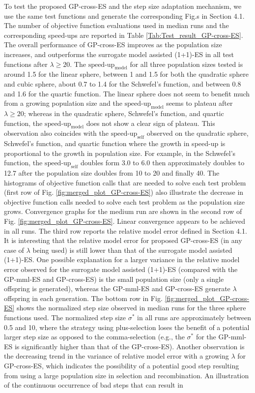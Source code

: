 To test the proposed GP-cross-ES and the step size adaptation mechanism, we use the same test functions and generate the corresponding Fig.s in Section 4.1. The number of objective function evaluations used in median runs and the corresponding speed-ups are reported in Table \ref{Tab:Test_result_GP-cross-ES}. The overall performance of GP-cross-ES improves as the population size increases, and outperforms the surrogate model assisted (1+1)-ES \cite{DBLP:conf/ppsn/KayhaniA18} in all test functions after $\lambda\geq 20$. The $\text{speed-up}_{\text{model}}$ for all three population sizes tested is around 1.5 for the linear sphere, between 1 and 1.5 for both the quadratic sphere and cubic sphere, about 0.7 to 1.4 for the Schwefel's function, and between 0.8 and 1.6 for the quartic function. The linear sphere does not seem to benefit much from a growing population size and the $\text{speed-up}_{\text{model}}$ seems to plateau after $\lambda \geq 20$; whereas in the quadratic sphere, Schwefel's function, and quartic function, the $\text{speed-up}_{\text{model}}$ does not show a clear sign of plateau. This observation also coincides with the $\text{speed-up}_{\text{self}}$ observed on the quadratic sphere, Schwefel's function, and quartic function where the growth in speed-up is proportional to the growth in population size. For example, in the Schwefel's function, the $\text{speed-up}_{\text{self}}$ doubles form 3.0 to 6.0 then approximately doubles to 12.7 after the population size doubles from 10 to 20 and finally 40. The histograms of objective function calls that are needed to solve each test problem (first row of Fig. \ref{fig:merged_plot_GP-cross-ES}) also illustrate the decrease in objective function calls needed to solve each test problem as the population size grows. Convergence graphs for the medium run are shown in the second row of Fig. \ref{fig:merged_plot_GP-cross-ES}. Linear convergence appears to be achieved in all runs. The third row reports the relative model error defined in Section 4.1. It is interesting that the relative model error for proposed GP-cross-ES (in any case of $\lambda$ being used) is still lower than that of the surrogate model assisted (1+1)-ES. One possible explanation for a larger variance in the relative model error observed for the surrogate model assisted (1+1)-ES (compared with the GP-mml-ES and GP-cross-ES) is the small population size (only a single offspring is generated), whereas the GP-mml-ES and GP-cross-ES generate $\lambda$ offspring in each generation. The bottom row in Fig. \ref{fig:merged_plot_GP-cross-ES} shows the normalized step size observed in median runs for the three sphere functions used. The normalized step size $\sigma^*$ in all runs are approximately between 0.5 and 10, where the strategy using plus-selection loses the benefit of a potential larger step size as opposed to the comma-selection (e.g., the $\sigma^*$ for the GP-mml-ES is significantly higher than that of the GP-cross-ES). Another observation is the decreasing trend in the variance of relative model error with a growing $\lambda$ for GP-cross-ES, which indicates the possibility of a potential good step resulting from using a large population size in selection and recombination. An illustration of the continuous occurrence of bad steps that can result in 